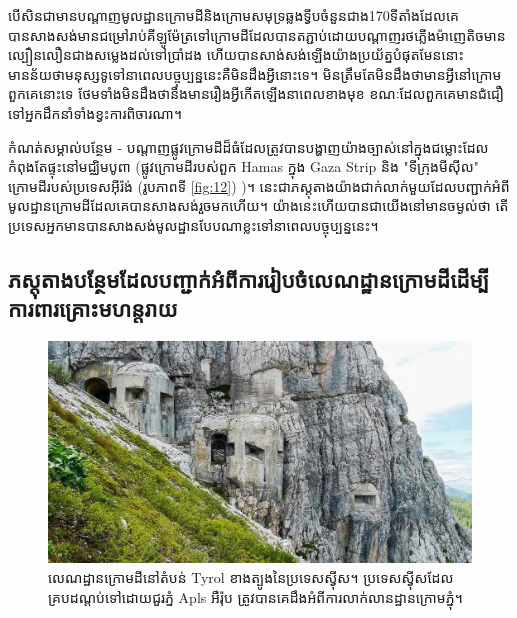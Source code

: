 \documentclass[10pt,twocolumn,letterpaper]{article}
\begin{document}
	បើសិនជាមានបណ្តាញមូលដ្ឋានក្រោមដីនិងក្រោមសមុទ្រឆ្លងទ្វីបចំនួនជាង170ទីតាំងដែលគេបានសាងសង់មានជម្រៅរាប់គីឡូម៉ែត្រទៅក្រោមដី​ ដែលបានតភ្ជាប់ដោយបណ្តាញរថភ្លើងម៉ាញេតិចមានល្បឿនលឿនជាងសម្លេងដល់ទៅប្រាំដង ហើយបានសាង់សង់ឡើងយ៉ាងប្រយ័ត្នបំផុតមែននោះ មានន័យថាមនុស្សទូទៅនាពេលបច្ចុប្បន្ននេះគឺមិនដឹងអ្វីនោះទេ។ មិនត្រឹមតែមិនដឹងថាមានអ្វីនៅក្រោមពួកគេនោះទេ ថែមទាំងមិនដឹងថានឹងមានរឿងអ្វីកើតឡើងនាពេលខាងមុខ ខណៈដែលពួកគេមានជំជឿទៅអ្នកដឹកនាំទាំងខ្វះការពិចារណា។

	កំណត់សម្គាល់បន្ថែម - បណ្តាញផ្លូវក្រោមដីដ៏ធំដែលត្រូវបានបង្ហាញយ៉ាងច្បាស់នៅក្នុងជម្លោះដែលកំពុងតែផ្ទុះនៅមជ្ឈិមបូពា (ផ្លូវក្រោមដីរបស់ពួក Hamas ក្នុង Gaza Strip\cite{38} និង "ទីក្រុងមីស៊ីល" ក្រោមដីរបស់ប្រទេសអុីរ៉ង់ (រូបភាពទី \ref{fig:12}) \cite{39,40})។ នេះជាភស្តុតាងយ៉ាងជាក់លាក់មួយដែលបញ្ជាក់អំពីមូលដ្ឋានក្រោមដីដែលគេបានសាងសង់រួចមកហើយ។ យ៉ាងនេះហើយបានជាយើងនៅមានចម្ងល់ថា តើប្រទេសអ្នកមានបានសាងសង់មូលដ្ឋានបែបណាខ្លះទៅនាពេលបច្ចុប្បន្ននេះ។ 
\subsection{ភស្តុតាងបន្ថែមដែលបញ្ជាក់អំពីការរៀបចំលេណដ្ឋានក្រោមដីដើម្បីការពារគ្រោះមហន្តរាយ}

\begin{figure}[t]
\begin{center}
   \includegraphics[width=1\linewidth]{tyrol.jpg}
\end{center}
   \caption{លេណដ្ឋានក្រោមដីនៅតំបន់ Tyrol ខាងត្បូងនៃប្រទេសស្វុីស។ ប្រទេសស្វុីសដែលគ្របដណ្តប់ទៅដោយជួរភ្នំ Apls អឺរ៉ុប ត្រូវបានគេដឹងអំពីការលាក់លានដ្ឋានក្រោមភ្នុំ\cite{32}។}
\label{fig:7}
\label{fig:onecol}
\end{figure}
\end{document}

